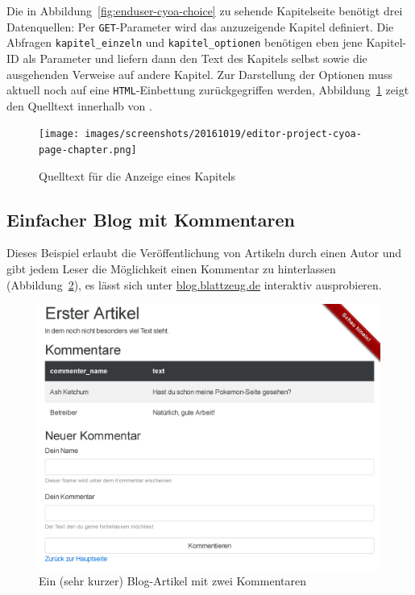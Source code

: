 Die in Abbildung~\ref{fig:enduser-cyoa-choice} zu sehende Kapitelseite benötigt drei Datenquellen: Per \texttt{GET}-Parameter wird das anzuzeigende Kapitel definiert. Die Abfragen \texttt{kapitel\_einzeln} und \texttt{kapitel\_optionen} benötigen eben jene Kapitel-ID als Parameter und liefern dann den Text des Kapitels selbst sowie die ausgehenden Verweise auf andere Kapitel. Zur Darstellung der Optionen muss aktuell noch auf eine \texttt{HTML}-Einbettung zurückgegriffen werden, Abbildung~\ref{fig:project-cyoa-page-chapter} zeigt den Quelltext innerhalb von \idename{}.

\begin{figure}[h]
  \centering \texttt{[image: images/screenshots/20161019/editor-project-cyoa-page-chapter.png]}
  \caption{Quelltext für die Anzeige eines Kapitels}
  \label{fig:project-cyoa-page-chapter}
\end{figure}

\subsection{Einfacher Blog mit Kommentaren}

Dieses Beispiel erlaubt die Veröffentlichung von Artikeln durch einen Autor und gibt jedem Leser die Möglichkeit einen Kommentar zu hinterlassen (Abbildung~\ref{fig:enduser-blog-article}), es lässt sich unter \href{http://blog.blattzeug.de/}{blog.blattzeug.de} interaktiv ausprobieren.

\begin{figure}[h]
  \centering \includegraphics[width=\textwidth-2pt,frame]{images/screenshots/20161019/enduser-blog-article.png}
  \caption{Ein (sehr kurzer) Blog-Artikel mit zwei Kommentaren}
  \label{fig:enduser-blog-article}
\end{figure}

